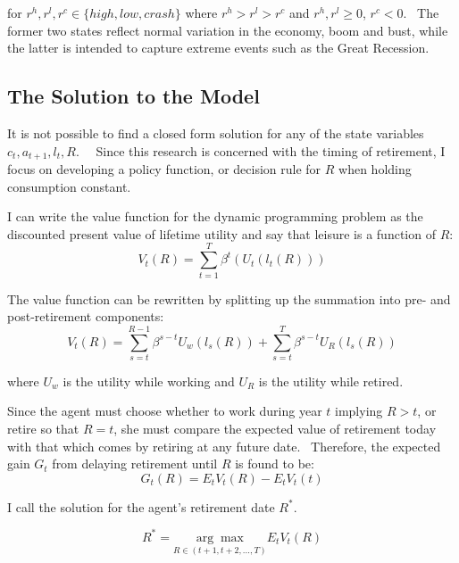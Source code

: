 \documentclass[12pt]{article}
\begin{document}
\noindent%
for $r^{h},r^{l},r^{c}\in \{high,low,crash\}$ where $r^{h}>r^{l}>r^{c}$ and $%
r^{h},r^{l}\geq 0$, $r^{c}<0$. \ The former two states reflect normal
variation in the economy, boom and bust, while the latter is intended to
capture extreme events such as the Great Recession.

\subsection{The Solution to the Model}

It is not possible to find a closed form solution for any of the state
variables $c_{t},a_{t+1},l_{t},R$. \ \ Since this research is concerned with
the timing of retirement, I focus on developing a policy function, or
decision rule for $R$ when holding consumption constant. \ 

I can write the value function for the dynamic programming problem as the
discounted present value of lifetime utility and say that leisure is a
function of $R$:%
\begin{equation}
V_{t}(R)=\sum_{t=1}^{T}\beta ^{t}(U_{t}(l_{t}(R)))
\end{equation}

\noindent%
The value function can be rewritten by splitting up the summation into pre-
and post-retirement components:%
\begin{equation}
V_{t}(R)=\sum_{s=t}^{R-1}\beta ^{s-t}U_{w}(l_{s}(R))+\sum_{s=t}^{T}\beta
^{s-t}U_{R}(l_{s}(R))
\end{equation}

\noindent%
where $U_{w}$ is the utility while working and $U_{R}$ is the utility while
retired. \ 

Since the agent must choose whether to work during year $t$ implying $R>t$,
or retire so that $R=t$, she must compare the expected value of retirement
today with that which comes by retiring at any future date. \ Therefore, the
expected gain $G_{t}$ from delaying retirement until $R$ is found to be:%
\begin{equation}
G_{t}(R)=E_{t}V_{t}(R)-E_{t}V_{t}(t)
\end{equation}

I call the solution for the agent's retirement date $R^{\ast }$. \ 

\begin{equation}
R^{\ast }=\underset{R\in (t+1,t+2,...,T)}{\arg \max }E_{t}V_{t}(R)
\end{equation}
\end{document}
